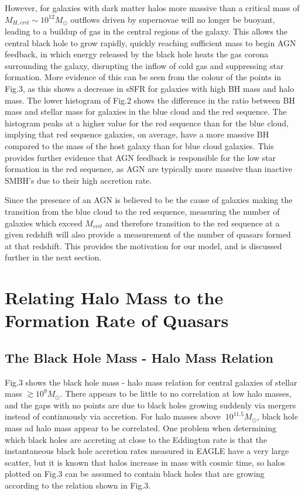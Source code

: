 \documentclass[12pt, twocolumn]{report}%
\begin{document}
\noindent However, for galaxies with dark matter halos more massive than a critical mass of $M_{H,crit}\sim10^{12}M_\odot$ outflows driven by supernovae will no longer be buoyant, leading to a buildup of gas in the central regions of the galaxy. This allows the central black hole to grow rapidly, quickly reaching sufficient mass to begin AGN feedback, in which energy released by the black hole heats the gas corona surrounding the galaxy, disrupting the inflow of cold gas and suppressing star formation. More evidence of this can be seen from the colour of the points in Fig.3, as this shows a decrease in sSFR for galaxies with high BH mass and halo mass. The lower histogram of Fig.2 shows the difference in the ratio between BH mass and stellar mass for galaxies in the blue cloud and the red sequence. The histogram peaks at a higher value for the red sequence than for the blue cloud, implying that red sequence galaxies, on average, have a more massive BH compared to the mass of the host galaxy than for blue cloud galaxies. This provides further evidence that AGN feedback is responsible for the low star formation in the red sequence, as AGN are typically more massive than inactive SMBH's due to their high accretion rate.\par

\vspace*{1cm}

Since the presence of an AGN is believed to be the cause of galaxies making the transition from the blue cloud to the red sequence, measuring the number of galaxies which exceed $M_{crit}$ and therefore transition to the red sequence at a given redshift will also provide a measurement of the number of quasars formed at that redshift. This provides the motivation for our model, and is discussed further in the next section.

\vspace*{2cm}

\section{Relating Halo Mass to the Formation Rate of Quasars}
\subsection{The Black Hole Mass - Halo Mass Relation}

Fig.3 shows the black hole mass - halo mass relation for central galaxies of stellar mass $\gtrsim10^9M_\odot$. There appears to be little to no correlation at low halo masses, and the gaps with no points are due to black holes growing suddenly via mergers instead of continuously via accretion. For halo masses above $~10^{11.5}M_\odot$, black hole mass ad halo mass appear to be correlated. One problem when determining which black holes are accreting at close to the Eddington rate is that the instantaneous black hole accretion rates measured in EAGLE have a very large scatter, but it is known that halos increase in mass with cosmic time, so halos plotted on Fig.3 can be assumed to contain black holes that are growing according to the relation shown in Fig.3.\par
\end{document}
